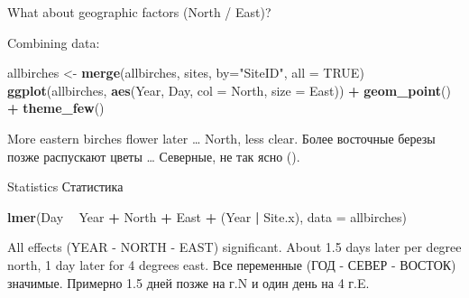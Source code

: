 \documentclass[9pt,ignorenonframetext,aspectratio=169]{beamer}
\newenvironment{Shaded}{\begin{snugshade}}{\end{snugshade}}
\newcommand{\DataTypeTok}[1]{\textcolor[rgb]{0.13,0.29,0.53}{#1}}
\newcommand{\KeywordTok}[1]{\textcolor[rgb]{0.13,0.29,0.53}{\textbf{#1}}}
\newcommand{\NormalTok}[1]{#1}
\newcommand{\OperatorTok}[1]{\textcolor[rgb]{0.81,0.36,0.00}{\textbf{#1}}}
\newcommand{\OtherTok}[1]{\textcolor[rgb]{0.56,0.35,0.01}{#1}}
\newcommand{\StringTok}[1]{\textcolor[rgb]{0.31,0.60,0.02}{#1}}
\begin{document}
\begin{frame}[fragile]{What about geographic factors (North / East)?}
\protect\hypertarget{what-about-geographic-factors-north-east}{}

Combining data:

\small

\begin{Shaded}
\begin{Highlighting}[]
\NormalTok{allbirches <-}\StringTok{ }\KeywordTok{merge}\NormalTok{(allbirches, sites, }\DataTypeTok{by=}\StringTok{"SiteID"}\NormalTok{, }\DataTypeTok{all =} \OtherTok{TRUE}\NormalTok{)}
\KeywordTok{ggplot}\NormalTok{(allbirches, }\KeywordTok{aes}\NormalTok{(Year, Day, }\DataTypeTok{col =}\NormalTok{ North, }\DataTypeTok{size =}\NormalTok{ East)) }\OperatorTok{+}\StringTok{ }\KeywordTok{geom_point}\NormalTok{() }\OperatorTok{+}\StringTok{ }\KeywordTok{theme_few}\NormalTok{()}
\end{Highlighting}
\end{Shaded}

\bcols
{}

\normalsize
\bi

\I More eastern birches flower later \ldots{} North, less clear.
\I Более восточные березы позже распускают цветы \ldots{} Северные, не
так ясно (). \ei \ecols

\end{frame}

\begin{frame}[fragile]{Statistics \textbar{} Статистика}
\protect\hypertarget{statistics--1}{}

\bc

\small

\begin{Shaded}
\begin{Highlighting}[]
\KeywordTok{lmer}\NormalTok{(Day }\OperatorTok{~}\StringTok{ }\NormalTok{Year }\OperatorTok{+}\StringTok{ }\NormalTok{North }\OperatorTok{+}\StringTok{ }\NormalTok{East }\OperatorTok{+}\StringTok{ }\NormalTok{(Year }\OperatorTok{|}\StringTok{ }\NormalTok{Site.x), }\DataTypeTok{data =}\NormalTok{ allbirches) }
\end{Highlighting}
\end{Shaded}

\small
\ec

\normalsize
\bcols
{}

All effects (YEAR - NORTH - EAST) significant. About 1.5 days later per
degree north, 1 day later for 4 degrees east.  Все переменные
(ГОД - СЕВЕР - ВОСТОК) значимые. Примерно 1.5 дней позже на г.N и один
день на 4 г.E. \ecols

\end{frame}
\end{document}
